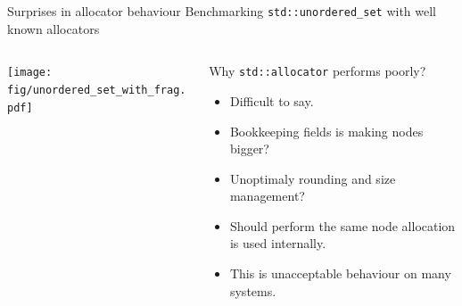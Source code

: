 \documentclass[10pt,aspectratio=169]{beamer}
\begin{document}
\begin{frame}
{Surprises in allocator behaviour}
{Benchmarking \texttt{std::unordered\_set} with well known allocators}
\begin{columns}

    \begin{column}{0.47\textwidth}
        \begin{center}
            
            \texttt{[image: fig/unordered\_set\_with\_frag.pdf]} \\
        \end{center}
    \end{column}

    \begin{column}{0.47\textwidth}
         \begin{block}{Why \texttt{std::allocator} performs poorly?}
           \begin{itemize}
           \item Difficult to say.
           \item Bookkeeping fields is making nodes bigger?
           \item Unoptimaly rounding and size management? 
           \item Should perform the same node
           allocation is used internally.
           \item {\color{alertc}This is unacceptable behaviour on many systems.}
           \end{itemize}
         \end{block}
    \end{column}

\end{columns}
\end{frame}


\end{document}
